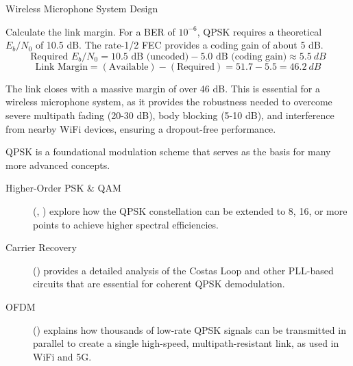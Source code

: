 \begin{workedexample}{Wireless Microphone System Design}
\begin{derivationsteps}
        \step Calculate the link margin. For a BER of $10^{-6}$, QPSK requires a theoretical $E_b/N_0$ of 10.5 dB. The rate-1/2 FEC provides a coding gain of about 5 dB.
        \[ \text{Required } E_b/N_0 = 10.5 \text{ dB (uncoded)} - 5.0 \text{ dB (coding gain)} \approx \qty{5.5}{dB} \]
        \[ \text{Link Margin} = (\text{Available}) - (\text{Required}) = 51.7 - 5.5 = \qty{46.2}{dB} \]
    \end{derivationsteps}
    
     The link closes with a massive margin of over 46 dB. This is essential for a wireless microphone system, as it provides the robustness needed to overcome severe multipath fading (20-30 dB), body blocking (5-10 dB), and interference from nearby WiFi devices, ensuring a dropout-free performance.
\end{workedexample}


\begin{importantbox}[title={Further Reading}]
    QPSK is a foundational modulation scheme that serves as the basis for many more advanced concepts.
    \begin{description}
        \item[Higher-Order PSK & QAM] (, ) explore how the QPSK constellation can be extended to 8, 16, or more points to achieve higher spectral efficiencies.
        \item[Carrier Recovery] () provides a detailed analysis of the Costas Loop and other PLL-based circuits that are essential for coherent QPSK demodulation.
        \item[OFDM] () explains how thousands of low-rate QPSK signals can be transmitted in parallel to create a single high-speed, multipath-resistant link, as used in WiFi and 5G.
    \end{description}
\end{importantbox}
